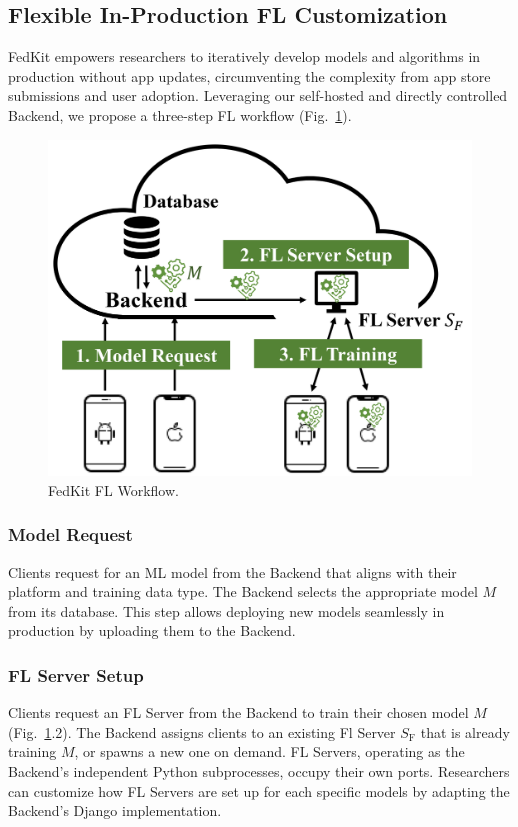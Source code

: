 \documentclass[letterpaper]{article} %
\begin{document}
\subsection{Flexible In-Production FL Customization}
\newcommand{\model}{$M$}
\newcommand{\fs}{$S_\mathrm F$}
FedKit empowers researchers to iteratively develop models and algorithms
in production without app updates,
circumventing the complexity from app store submissions and user adoption.
Leveraging our self-hosted and directly controlled Backend,
we propose a three-step FL workflow
(Fig.~\ref{fig:fl-workflow}).
\begin{figure}
    \centering
    \includegraphics*[width=0.8\linewidth]{fl_workflow.pdf}
    \caption{FedKit FL Workflow.}
    \label{fig:fl-workflow}
\end{figure}

\subsubsection{Model Request}
Clients request for an ML model from the Backend that
aligns with their platform and training data type.
The Backend selects the appropriate model \model{} from its database.
This step allows deploying new models seamlessly
in production by uploading them to the Backend.

\subsubsection{FL Server Setup}
Clients request an FL Server from the Backend to
train their chosen model \model{}
(Fig.~\ref{fig:fl-workflow}.2).
The Backend assigns clients to an existing Fl Server \fs{} that
is already training \model{},
or spawns a new one on demand.
FL Servers, operating as the Backend's independent Python subprocesses,
occupy their own ports.
Researchers can customize how FL Servers are set up for each specific models by
adapting the Backend's Django implementation.
\end{document}
